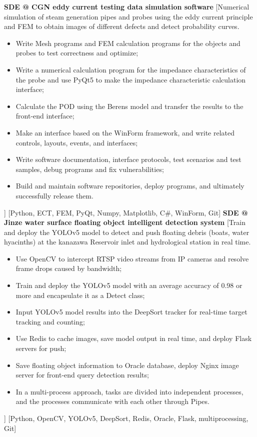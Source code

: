\else
    \begin{experiences}
        {\textbf{SDE @ CGN eddy current testing data simulation software}}%
        [Numerical simulation of steam generation pipes and probes using the eddy current principle and FEM to obtain images of different defects and detect probability curves.
            \begin{itemize}
                \item {Write Mesh programs and FEM calculation programs for the objects and probes to test correctness and optimize;}
                \item {Write a numerical calculation program for the impedance characteristics of the probe and use PyQt5 to make the impedance characteristic calculation interface;}
                \item {Calculate the POD using the Berens model and transfer the results to the front-end interface;}
                \item {Make an interface based on the WinForm framework, and write related controls, layouts, events, and interfaces;}
                \item {Write software documentation, interface protocols, test scenarios and test samples, debug programs and fix vulnerabilities;}
                \item {Build and maintain software repositories, deploy programs, and ultimately successfully release them.}
            \end{itemize}]
        [Python, ECT, FEM, PyQt, Numpy, Matplotlib, C\#, WinForm, Git]
        \separator{0.5ex}
        {\textbf{SDE @ Jinze water surface floating object intelligent detection system}}%
        [Train and deploy the YOLOv5 model to detect and push floating debris (boats, water hyacinths) at the kanazawa Reservoir inlet and hydrological station in real time.
            \begin{itemize}
                \item {Use OpenCV to intercept RTSP video streams from IP cameras and resolve frame drops caused by bandwidth;}
                \item {Train and deploy the YOLOv5 model with an average accuracy of 0.98 or more and encapsulate it as a Detect class;}
                \item {Input YOLOv5 model results into the DeepSort tracker for real-time target tracking and counting;}
                \item {Use Redis to cache images, save model output in real time, and deploy Flask servers for push;}
                \item {Save floating object information to Oracle database, deploy Nginx image server for front-end query detection results;}
                \item {In a multi-process approach, tasks are divided into independent processes, and the processes communicate with each other through Pipes.}
            \end{itemize}]
        [Python, OpenCV, YOLOv5, DeepSort, Redis, Oracle, Flask, multiprocessing, Git]
    \end{experiences}
\fi